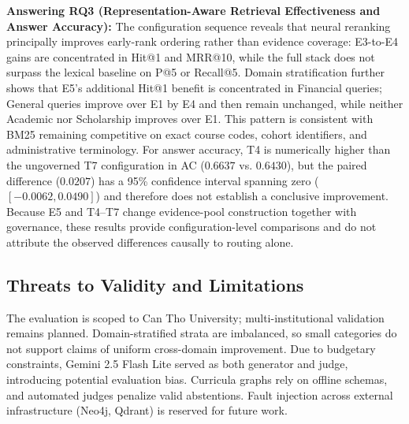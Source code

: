\textbf{Answering RQ3 (Representation-Aware Retrieval Effectiveness and Answer Accuracy):} The configuration sequence reveals that neural reranking principally improves early-rank ordering rather than evidence coverage: E3-to-E4 gains are concentrated in Hit@1 and MRR@10, while the full stack does not surpass the lexical baseline on P@5 or Recall@5. Domain stratification further shows that E5's additional Hit@1 benefit is concentrated in Financial queries; General queries improve over E1 by E4 and then remain unchanged, while neither Academic nor Scholarship improves over E1. This pattern is consistent with BM25 remaining competitive on exact course codes, cohort identifiers, and administrative terminology. For answer accuracy, T4 is numerically higher than the ungoverned T7 configuration in AC ($0.6637$ vs. $0.6430$), but the paired difference ($0.0207$) has a 95\% confidence interval spanning zero ($[-0.0062, 0.0490]$) and therefore does not establish a conclusive improvement. Because E5 and T4--T7 change evidence-pool construction together with governance, these results provide configuration-level comparisons and do not attribute the observed differences causally to routing alone.

\subsection{Threats to Validity and Limitations}
\label{sec:limitations}

The evaluation is scoped to Can Tho University; multi-institutional validation remains planned. Domain-stratified strata are imbalanced, so small categories do not support claims of uniform cross-domain improvement. Due to budgetary constraints, Gemini 2.5 Flash Lite served as both generator and judge, introducing potential evaluation bias. Curricula graphs rely on offline schemas, and automated judges penalize valid abstentions. Fault injection across external infrastructure (Neo4j, Qdrant) is reserved for future work.
